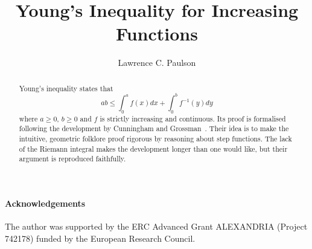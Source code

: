 \documentclass[11pt,a4paper]{article}
\begin{document}
\title{Young's Inequality for Increasing Functions}
\author{Lawrence C. Paulson}
\maketitle

\begin{abstract}
Young's inequality states that
$$ ab \leq \int_0^a f(x)dx + \int_0^b f^{-1}(y) dy $$
where $a\geq 0$, $b\geq 0$ and $f$ is strictly increasing and continuous.
Its proof is formalised following the development by Cunningham and Grossman~\cite{cunningham-youngs}.
Their idea is to make the intuitive, geometric folklore proof rigorous by reasoning about step functions.
The lack of the Riemann integral makes the development longer than one would like, but their argument is reproduced faithfully.
\end{abstract}

\newpage
\tableofcontents

\paragraph*{Acknowledgements}
The author was supported by the ERC Advanced Grant ALEXANDRIA (Project 742178) funded by the European Research Council. 

\newpage





\end{document}
